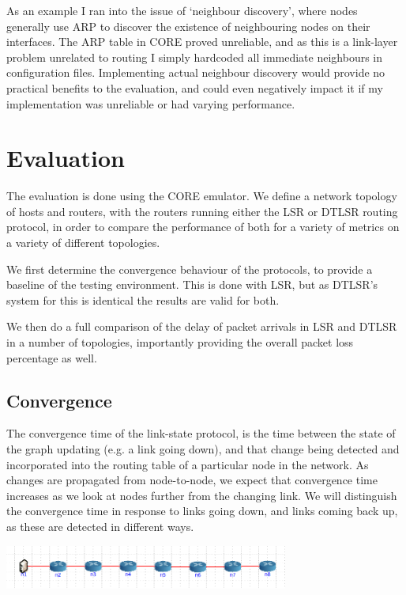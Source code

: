 \documentclass[10pt,twoside,a4paper]{article}
\begin{document}
As an example I ran into the issue of `neighbour discovery', where nodes generally use ARP to discover the existence of neighbouring nodes on their interfaces. The ARP table in CORE proved unreliable, and as this is a link-layer problem unrelated to routing I simply hardcoded all immediate neighbours in configuration files. Implementing actual neighbour discovery would provide no practical benefits to the evaluation, and could even negatively impact it if my implementation was unreliable or had varying performance.


\section{Evaluation}

The evaluation is done using the CORE emulator. We define a network topology of hosts and routers, with the routers running either the LSR or DTLSR routing protocol, in order to compare the performance of both for a variety of metrics on a variety of different topologies.

We first determine the convergence behaviour of the protocols, to provide a baseline of the testing environment. This is done with LSR, but as DTLSR's system for this is identical the results are valid for both.

We then do a full comparison of the delay of packet arrivals in LSR and DTLSR in a number of topologies, importantly providing the overall packet loss percentage as well.

\subsection{Convergence}

The convergence time of the link-state protocol, is the time between the state of the graph updating (e.g. a link going down), and that change being detected and incorporated into the routing table of a particular node in the network. As changes are propagated from node-to-node, we expect that convergence time increases as we look at nodes further from the changing link. We will distinguish the convergence time in response to links going down, and links coming back up, as these are detected in different ways.

\begin{minipage}{1\textwidth} \centering
	\includegraphics[width=0.7\textwidth]{conv_topology}
	\label{fig:conv_topology}
\end{minipage}
\end{document}
